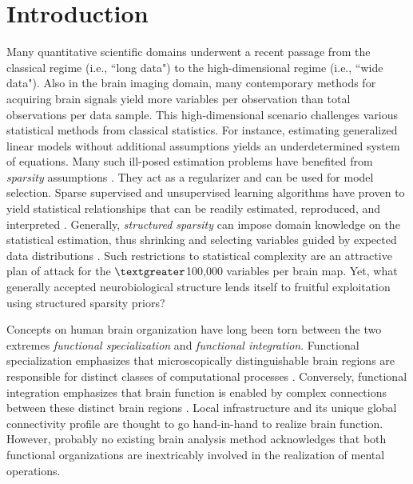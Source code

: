 \documentclass{article}
\begin{document}
\section{Introduction}
Many quantitative scientific domains underwent a
recent passage from the classical regime (i.e., ``long data")  to
the high-dimensional regime (i.e., ``wide data").
Also in the brain imaging domain,
many contemporary methods for acquiring brain signals yield
more variables per observation than
total observations per data sample.
This high-dimensional scenario challenges various statistical methods from
classical statistics.
For instance,
estimating generalized linear models without additional assumptions
yields an underdetermined system of equations.
%
Many such ill-posed estimation problems
have benefited from
\textit{sparsity} assumptions
\cite{hastie2015statistical}.
They act as a 
regularizer and can be used for model selection.
Sparse supervised and unsupervised
learning algorithms have proven to yield
statistical relationships that can be readily
estimated, reproduced, and interpreted
\cite{giraud2014introduction}.
%
Generally, \textit{structured sparsity} can impose
domain knowledge on the 
statistical estimation,
thus shrinking and selecting variables guided by
expected data distributions
\cite{bach2012optimization}.
Such restrictions to statistical complexity
are an attractive plan of attack
for the $\textgreater$100,000 variables per brain map.
Yet, what generally accepted neurobiological structure lends itself
to fruitful exploitation using structured sparsity priors?



Concepts on human brain organization have long been torn
between the two extremes
\textit{functional specialization} and \textit{functional integration}.
Functional specialization emphasizes that microscopically distinguishable
brain regions are responsible for distinct classes of computational 
processes
\cite{kanwisher2010functional}.
Conversely, functional integration emphasizes that brain function
is enabled by complex connections between these
distinct brain regions \cite{sporns14nn}.
%
Local
infrastructure
and its unique global connectivity profile are thought to go hand-in-hand
to realize brain function.
%
However,
probably no existing brain analysis method acknowledges that
both functional organizations are inextricably involved
in the realization of mental operations.
\end{document}
